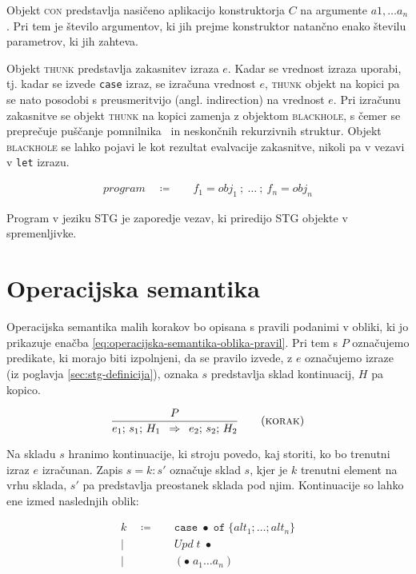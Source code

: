 Objekt \textsc{con} predstavlja nasičeno aplikacijo konstruktorja $C$ na argumente $a1, \dots a_n$. Pri tem je število argumentov, ki jih prejme konstruktor natančno enako številu parametrov, ki jih zahteva.

Objekt \textsc{thunk} predstavlja zakasnitev izraza $e$. Kadar se vrednost izraza uporabi, tj. kadar se izvede \texttt{case} izraz, se izračuna vrednost $e$, \textsc{thunk} objekt na kopici pa se nato posodobi s preusmeritvijo (angl. indirection) na vrednost $e$. Pri izračunu zakasnitve se objekt \textsc{thunk} na kopici zamenja z objektom \textsc{blackhole}, s čemer se preprečuje puščanje pomnilnika~\cite{jones1992tail} in neskončnih rekurzivnih struktur. Objekt \textsc{blackhole} se lahko pojavi le kot rezultat evalvacije zakasnitve, nikoli pa v vezavi v \texttt{let} izrazu.

\begin{align*}
	program \quad \coloneq& \quad f_1 = obj_1 \: ; \: \dots \: ; \: f_n = obj_n
\end{align*}

Program v jeziku STG je zaporedje vezav, ki priredijo STG objekte v spremenljivke.

\section{Operacijska semantika}
\label{sec:operacijska-semantika}

Operacijska semantika malih korakov bo opisana s pravili podanimi v obliki, ki jo prikazuje enačba \ref{eq:operacijska-semantika-oblika-pravil}. Pri tem s $P$ označujemo predikate, ki morajo biti izpolnjeni, da se pravilo izvede, z $e$ označujemo izraze (iz poglavja \ref{sec:stg-definicija}), oznaka $s$ predstavlja sklad kontinuacij, $H$ pa kopico.

\begin{equation}
    \infer[korak]{P}{
	e_1; \, s_1; \, H_1
}{
	e_2; \, s_2; \, H_2
}
	\label{eq:operacijska-semantika-oblika-pravil}
\end{equation}

Na skladu $s$ hranimo kontinuacije, ki stroju povedo, kaj storiti, ko bo trenutni izraz $e$ izračunan. Zapis $s = k : s'$ označuje sklad $s$, kjer je $k$ trenutni element na vrhu sklada, $s'$ pa predstavlja preostanek sklada pod njim. Kontinuacije so lahko ene izmed naslednjih oblik:

\begin{align*}
	k \quad \coloneq& \quad \texttt{case} \; \bullet \; \texttt{of} \; \{ alt_1; \dots; alt_n \}\\
	\vert& \quad \textit{Upd} \; t \; \bullet\\
	\vert& \quad (\bullet \; a_1 \dots a_n)
\end{align*}

